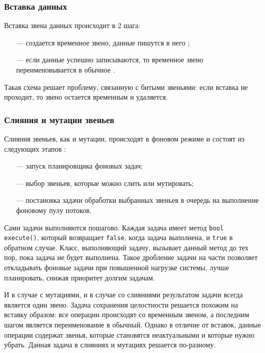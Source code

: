 \subsubsection{Вставка данных}

Вставка звена данных происходит в 2 шага:
\begin{itemize}
	\item [---] создается временное звено, данные пишутся в него \cite{inserttemp};
	\item [---] если данные успешно записываются, то временное звено переименовывается в обычное \cite{insertrename}.
\end{itemize}

Такая схема решает проблему, связанную с битыми звеньями: если вставка не проходит, то звено остается временным и удаляется.

\subsubsection{Слияния и мутации звеньев}

Слияния звеньев, как и мутации, происходят в фоновом режиме и состоят из следующих этапов \cite{backgroundproc}:
\begin{itemize}
	\item [---] запуск планировщика фоновых задач;
	\item [---] выбор звеньев, которые можно слить или мутировать;
	\item [---] постановка задачи обработки выбранных звеньев в очередь на выполнение фоновому пулу потоков.
\end{itemize}

Сами задачи выполняются пошагово. Каждая задача имеет метод \texttt{bool execute()}, который возвращает \texttt{false}, когда задача выполнена, и \texttt{true} в обратном случае. Класс, выполняющий задачу, вызывает данный метод до тех пор, пока задача не будет выполнена. Такое дробление задачи на части позволяет откладывать фоновые задачи при повышенной нагрузке системы, лучше планировать, снижая приоритет долгим задачам.

И в случае с мутациями, и в случае со слияниями результатом задачи всегда является один звено. Задача сохранения целостности решается похожим на вставку образом: все операции происходят со временным звеном, а последним шагом является переименование в обычный. Однако в отличие от вставок, данные операции содержат звенья, которые становятся неактуальными и которые нужно убрать. Данная задача в слияниях и мутациях решается по-разному.

